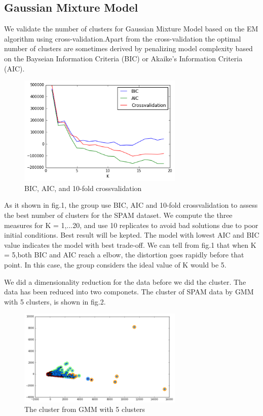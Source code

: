 \subsection{Gaussian Mixture Model}
We validate the number of clusters for Gaussian Mixture Model based on the EM algorithm using cross-validation.Apart from the cross-validation the optimal number of clusters are sometimes derived by penalizing model complexity based on the Bayseian Information Criteria (BIC) or Akaike's Information Criteria (AIC).


\begin{figure}[!ht]
	\centering
	\includegraphics[width=0.7\textwidth]{Fig/BIC-AIC.png}
	\vspace{-5pt}
	\caption{BIC, AIC, and 10-fold crossvalidation}
	\label{fig:BIC-AIC}
\end{figure}

As it shown in fig.1, the group use BIC, AIC and 10-fold crossvalidation to assess the best number of clusters for the SPAM dataset. We compute the three measures for K = 1,...20, and use 10 replicates to avoid bad solutions due to poor initial conditions. Best result will be kepted. The model with lowest AIC and BIC value indicates the model with best trade-off. We can tell from fig.1 that when K = 5,both BIC and AIC reach a elbow, the distortion goes rapidly before that point. In this case, the group considers the ideal value of K would be 5.


We did a dimensionality reduction for the data before we did the cluster. The data has been reduced into two componets. The cluster of SPAM data by GMM with 5 clusters, is shown in fig.2.     

\vspace{-5pt}
\begin{figure}[!ht]
	\centering
	\includegraphics[width=0.7\textwidth]{Fig/GMM-plot.png}
	\vspace{-5pt}
	\caption{The cluster from GMM with 5 clusters}
	\label{fig:BIC-AIC}
\end{figure}